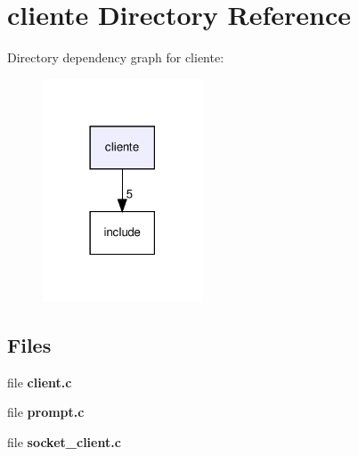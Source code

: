 \section{cliente Directory Reference}
\label{dir_ee23875512b03122aad1d4f8be53eb59}
Directory dependency graph for cliente\+:\nopagebreak
\begin{figure}[H]
\begin{center}
\leavevmode
\includegraphics[width=134pt]{dir_ee23875512b03122aad1d4f8be53eb59_dep}
\end{center}
\end{figure}
\subsection*{Files}
\begin{DoxyCompactItemize}
\item 
file \textbf{ client.\+c}
\item 
file \textbf{ prompt.\+c}
\item 
file \textbf{ socket\+\_\+client.\+c}
\end{DoxyCompactItemize}
